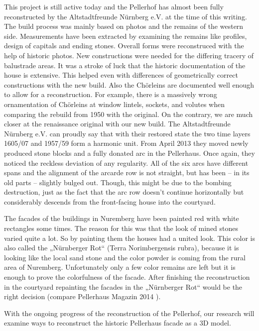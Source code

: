 This project is still active today and the Pellerhof has almost been fully reconstructed by the Altstadtfreunde Nürnberg e.V. at the time of this writing. The build process was mainly based on photos and the remains of the western side. Measurements have been extracted by examining the remains like profiles, design of capitals and ending stones. Overall forms were reconstruced with the help of historic photos. New constructions were needed for the differing tracery of balustrade areas. It was a stroke of luck that the historic documentation of the house is extensive. This helped even with differences of geometrically correct constructions with the new build. Also the Chörleins are documented well enough to allow for a reconstruction. For example, there is a massively wrong ornamentation of Chörleins at window lintels, sockets, and volutes when comparing the rebuild from 1950 with the original. On the contrary, we are much closer at the renaissance original with our new build. The Altstadtfreunde Nürnberg e.V. can proudly say that with their restored state the two time layers 1605/07 and 1957/59 form a harmonic unit. From April 2013 they moved newly produced stone blocks and a fully donated arc in the Pellerhaus. Once again, they noticed the reckless deviation of any regularity. All of the six arcs have different spans and the alignment of the arcarde row is not straight, but has been – in its old parts – slightly bulged out. Though, this might be due to the bombing destruction, just as the fact that the arc row doesn't continue horizontally but considerably descends from the front-facing house into the courtyard.

The facades of the buildings in Nuremberg have been painted red with white rectangles some times. The reason for this was that the look of mined stones varied quite a lot. So by painting them the houses had a united look. This color is also called the „Nürnberger Rot“ (Terra Norimbergensis rubra), because it is looking like the local sand stone and the color powder is coming from the rural area of Nuremberg. Unfortunately only a few color remains are left but it is enough to prove the colorfulness of the facade. After finishing the reconstruction in the courtyard repainting the facades in the „Nürnberger Rot“ would be the right decision (compare Pellerhaus Magazin 2014 \parencite{afPellerhausMagazin03}).

With the ongoing progress of the reconstruction of the Pellerhof, our research will examine ways to reconstruct the historic Pellerhaus facade as a 3D model.\\

